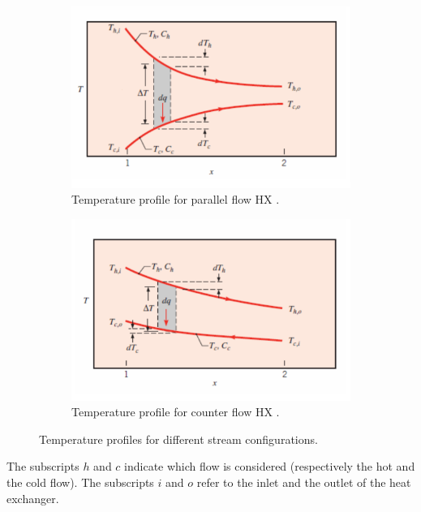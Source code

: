 \begin{figure}[h]
    \centering
    \begin{subfigure}[b]{0.45\textwidth}
        \centering
        \includegraphics[width=\textwidth]{parallele_flow_T}
        \caption{Temperature profile for parallel flow HX \cite{Ngendakumana2018}.}
        \label{fig:C4_HX_par_flow_T}
    \end{subfigure}
    \begin{subfigure}[b]{0.45\textwidth}
        \centering
        \includegraphics[width=\textwidth]{opposite_flow_T}
        \caption{Temperature profile for counter flow HX \cite{Ngendakumana2018}.}
        \label{fig:C4_HX_opo_flow_T}
    \end{subfigure}
    \caption{Temperature profiles for different stream configurations.}
    \label{fig:C4_Tprof}
\end{figure}

The subscripts $h$ and $c$ indicate which flow is considered (respectively the hot and the cold flow). The subscripts $i$ and $o$ refer to the inlet and the outlet of the heat exchanger.

